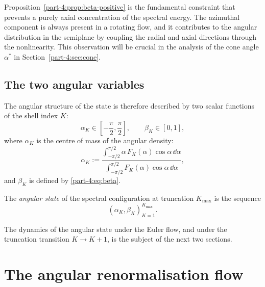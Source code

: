 \begin{remark}\label{part-4:rem:spiral}
Proposition~\ref{part-4:prop:beta-positive} is the fundamental constraint 
that prevents a purely axial concentration of the spectral energy. 
The azimuthal component is always present in a rotating flow, and it 
contributes to the angular distribution in the semiplane by coupling 
the radial and axial directions through the nonlinearity. This 
observation will be crucial in the analysis of the cone angle 
$\alpha^\ast$ in Section~\ref{part-4:sec:cone}.
\end{remark}

\subsection{The two angular variables}
\label{part-4:ssec:two-vars}

The angular structure of the state is therefore described by two 
scalar functions of the shell index $K$:
\begin{equation}\label{part-4:eq:two-vars}
\alpha_K \in \left[-\frac{\pi}{2}, \frac{\pi}{2}\right],
\qquad
\beta_K \in [0,1],
\end{equation}
where $\alpha_K$ is the centre of mass of the angular density:
\begin{equation}\label{part-4:eq:alpha-K}
\alpha_K := \frac{\int_{-\pi/2}^{\pi/2}\alpha\,F_K(\alpha)\cos\alpha\,\dd\alpha}
                {\int_{-\pi/2}^{\pi/2}F_K(\alpha)\cos\alpha\,\dd\alpha},
\end{equation}
and $\beta_K$ is defined by \eqref{part-4:eq:beta}.

\begin{definition}\label{part-4:def:angular-state}
The \emph{angular state} of the spectral configuration at truncation 
$K_{\max}$ is the sequence
\begin{equation}\label{part-4:eq:angular-state}
(\alpha_K, \beta_K)_{K=1}^{K_{\max}}.
\end{equation}
\end{definition}

The dynamics of the angular state under the Euler flow, and under the 
truncation transition $K\to K+1$, is the subject of the next two 
sections.

\section{The angular renormalisation flow}
\label{part-4:sec:angular-renorm}


